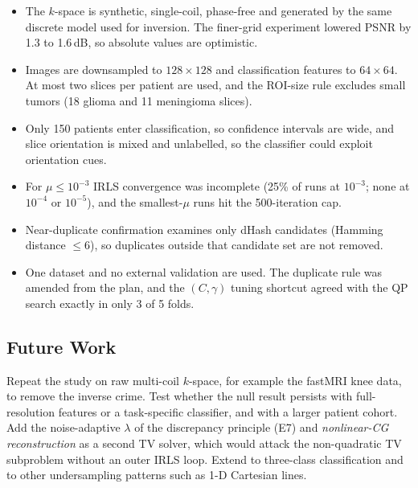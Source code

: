 \documentclass[conference,a4paper]{IEEEtran}
\begin{document}
\begin{itemize}[leftmargin=1.1em,itemsep=1pt,topsep=2pt]
\item The $k$-space is synthetic, single-coil, phase-free and generated by the same discrete model used for inversion. The finer-grid experiment lowered PSNR by 1.3 to 1.6\,dB, so absolute values are optimistic.
\item Images are downsampled to $128\times128$ and classification features to $64\times64$. At most two slices per patient are used, and the ROI-size rule excludes small tumors (18 glioma and 11 meningioma slices).
\item Only 150 patients enter classification, so confidence intervals are wide, and slice orientation is mixed and unlabelled, so the classifier could exploit orientation cues.
\item For $\mu\le10^{-3}$ IRLS convergence was incomplete (25\% of runs at $10^{-3}$; none at $10^{-4}$ or $10^{-5}$), and the smallest-$\mu$ runs hit the 500-iteration cap.
\item Near-duplicate confirmation examines only dHash candidates (Hamming distance $\le6$), so duplicates outside that candidate set are not removed.
\item One dataset and no external validation are used. The duplicate rule was amended from the plan, and the $(C,\gamma)$ tuning shortcut agreed with the QP search exactly in only 3 of 5 folds.
\end{itemize}

\subsection{Future Work}
Repeat the study on raw multi-coil $k$-space, for example the fastMRI knee data, to remove the inverse crime. Test whether the null result persists with full-resolution features or a task-specific classifier, and with a larger patient cohort. Add the noise-adaptive $\lambda$ of the discrepancy principle (E7) and \emph{nonlinear-CG reconstruction} as a second TV solver, which would attack the non-quadratic TV subproblem without an outer IRLS loop. Extend to three-class classification and to other undersampling patterns such as 1-D Cartesian lines.
\end{document}
